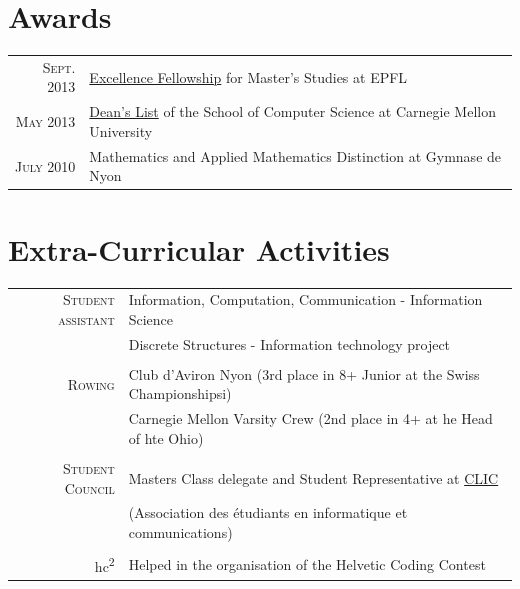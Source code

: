 \documentclass[a4paper,11pt]{article} %
\begin{document}
\section{Awards}

\begin{tabular}{rl}
\textsc{Sept.} 2013 & 
\href{http://master.epfl.ch/excellence-fellowships}{Excellence Fellowship} for Master's Studies at EPFL\\
\textsc{May} 2013 & 
\href{http://coursecatalog.web.cmu.edu/schoolofcomputerscience/#schoolofcomputersciencescsacademicstandardsandactions}{Dean's
List} of the School of Computer Science at Carnegie Mellon University\\
\textsc{July} 2010 & 
Mathematics and Applied Mathematics Distinction at Gymnase de Nyon\\
\end{tabular}

\pagebreak
{}



\section{Extra-Curricular Activities}
\begin{tabular}{rl}
\textsc{\large{Student assistant}} &
Information, Computation, Communication -
Information Science \\
& Discrete Structures - 
Information technology project \\
\multicolumn{2}{c}{} \\

\textsc{\large{Rowing}} &
Club d'Aviron Nyon (3rd place in 8+ Junior at the Swiss Championshipsi)\\
& Carnegie Mellon Varsity Crew (2nd place in 4+ at he Head of hte Ohio)\\
\multicolumn{2}{c}{} \\

\textsc{\large{Student Council}} &
Masters Class delegate and Student Representative at
\href{http://clic.epfl.ch/}{CLIC}\\
& (Association des étudiants en informatique et communications)\\
\multicolumn{2}{c}{} \\

\large{hc\textsuperscript{2}} & Helped in the organisation of the Helvetic Coding Contest\\
\end{tabular}
\end{document}
